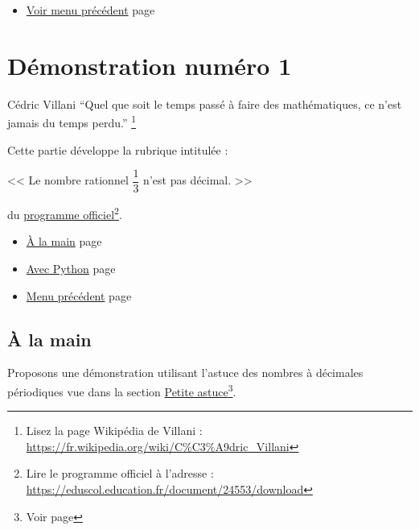 \documentclass[a4paper,11pt]{book}
\begin{document}
\begin{itemize}
\item \hyperref[orgc52e956]{Voir menu précédent}
page~\pageref{page:proofs-menu}
\end{itemize}


\clearpage

\chapter{Démonstration numéro 1}
\label{sec:org0f2f2e8}
\label{org6413964}
\label{page:sec4.2proof1}

\begin{myquote}{Cédric Villani}
\enquote{Quel que soit le temps passé à faire des mathématiques, ce n'est
jamais du temps perdu.}
\footnote{Lisez la page Wikipédia de Villani : \url{https://fr.wikipedia.org/wiki/C\%C3\%A9dric_Villani}}
\end{myquote}

\clearpage

Cette partie développe la rubrique intitulée :

<< Le nombre rationnel \(\dfrac{1}{3}\) n'est pas décimal. >>

du \href{https://eduscol.education.fr/document/24553/download}{programme officiel}\footnote{Lire le programme officiel à l'adresse :
\url{https://eduscol.education.fr/document/24553/download}}.

\clearpage


\label{orgfe369e8}
\label{page:proof1-menu}
\begin{itemize}
\item \hyperref[orga226baf]{À la main} page \pageref{page:sec4.2.1hand}
\item \hyperref[org498288d]{Avec Python} page \pageref{page:sec4.2.2python}
\item \hyperref[orgc52e956]{Menu précédent} page \pageref{page:proofs-menu}
\end{itemize}



\clearpage

\section{À la main}
\label{sec:orgcaec7fc}
\label{orga226baf}
\label{page:sec4.2.1hand}

Proposons une démonstration utilisant l'astuce des nombres à
décimales périodiques vue dans la section \hyperref[org36b98de]{Petite astuce}\footnote{Voir page \pageref{page:sec2.6.3tip}}.
\end{document}
